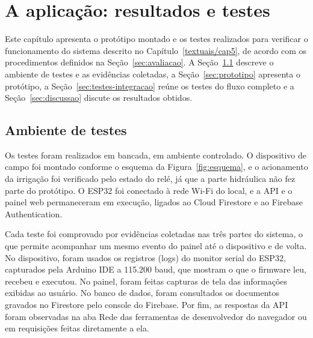 \chapter{A aplicação: resultados e testes}
\label{textuais/cap6}

\providecommand{\preencher}[1]{\textcolor{red}{[#1]}}
\providecommand{\figuraprovisoria}[2]{\fbox{\parbox[c][#1][c]{0.9\textwidth}{\centering\textcolor{red}{#2}}}}
\providecommand{\logprovisorio}[1]{\textcolor{red}{[#1]}}

Este capítulo apresenta o protótipo montado e os testes realizados para verificar o funcionamento do sistema descrito no Capítulo~\ref{textuais/cap5}, de acordo com os procedimentos definidos na Seção~\ref{sec:avaliacao}. A Seção~\ref{sec:ambiente-testes} descreve o ambiente de testes e as evidências coletadas, a Seção~\ref{sec:prototipo} apresenta o protótipo, a Seção~\ref{sec:testes-integracao} reúne os testes do fluxo completo e a Seção~\ref{sec:discussao} discute os resultados obtidos.

\section{Ambiente de testes}
\label{sec:ambiente-testes}

Os testes foram realizados em bancada, em ambiente controlado. O dispositivo de campo foi montado conforme o esquema da Figura~\ref{fig:esquema}, e o acionamento da irrigação foi verificado pelo estado do relé, já que a parte hidráulica não fez parte do protótipo. O ESP32 foi conectado à rede Wi-Fi do local, e a API e o painel web permaneceram em execução, ligados ao Cloud Firestore e ao Firebase Authentication.

Cada teste foi comprovado por evidências coletadas nas três partes do sistema, o que permite acompanhar um mesmo evento do painel até o dispositivo e de volta. No dispositivo, foram usados os registros (logs) do monitor serial do ESP32, capturados pela Arduino IDE a 115.200 baud, que mostram o que o firmware leu, recebeu e executou. No painel, foram feitas capturas de tela das informações exibidas ao usuário. No banco de dados, foram consultados os documentos gravados no Firestore pelo console do Firebase. Por fim, as respostas da API foram observadas na aba Rede das ferramentas de desenvolvedor do navegador ou em requisições feitas diretamente a ela.

